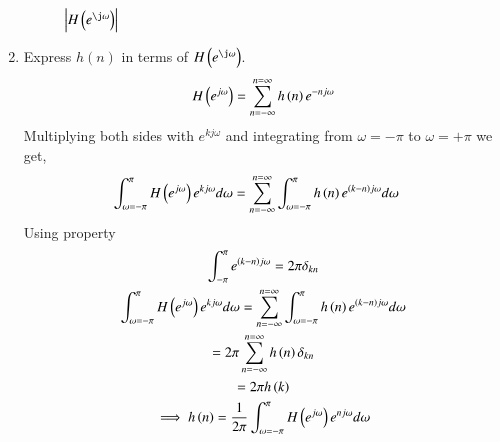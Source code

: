 \documentclass[journal,12pt,twocolumn]{IEEEtran}
\renewcommand\thesection{\arabic{section}}
\begin{document}
\begin{enumerate}[label=\thesection.\arabic*]
\begin{figure}[!ht]
	\caption{$\abs{H\brak{e^{\j\omega}}}$}
	\label{fig:dtft}
\end{figure}
\item Express $h(n)$ in terms of $H\brak{e^{\j \omega}}$.
\solution 
\begin{align}
	H\left(e^{j\omega}\right)=\sum_{n=-\infty}^{n=\infty}h\left(n\right)e^{-nj\omega}
\end{align}
Multiplying both sides with $e^{kj\omega}$ and integrating from $\omega=-\pi$ to $\omega=+\pi$ we get,
\begin{align}
	\int_{\omega=-\pi}^{\pi}H\left(e^{j\omega}\right)e^{kj\omega} d\omega&=\sum_{n=-\infty}^{n=\infty}\int_{\omega=-\pi}^{\pi}h\left(n\right)e^{\left(k-n\right)j\omega}d\omega
\end{align}
Using property 
\begin{multline}
	\int_{-\pi}^{\pi}e^{\left(k-n\right)j\omega}=2\pi\delta_{kn}\\
	\int_{\omega=-\pi}^{\pi}H\left(e^{j\omega}\right)e^{kj\omega} d\omega=\sum_{n=-\infty}^{n=\infty}\int_{\omega=-\pi}^{\pi}h\left(n\right)e^{\left(k-n\right)j\omega}d\omega\\
	=2\pi\sum_{n=-\infty}^{n=\infty}h\left(n\right)\delta_{kn}\\
	=2\pi h\left(k\right)\\
	\implies h\left(n\right)=\frac{1}{2\pi}\int_{\omega=-\pi}^{\pi}H\left(e^{j\omega}\right)e^{nj\omega} d\omega
\end{multline}
\end{enumerate}
\end{document}
